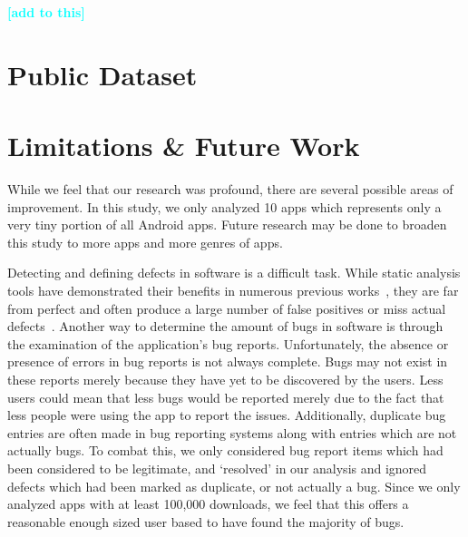 \documentclass{sig-alternate}
\newcommand{\todo}[1]{\textcolor{cyan}{\textbf{[#1]}}}
\begin{document}
\todo{add to this}

\section{Public Dataset}
\label{sec:dataset}






\section{Limitations \& Future Work}
\label{sec:threats}


While we feel that our research was profound, there are several possible areas of improvement. In this study, we only analyzed 10 apps which represents only a very tiny portion of all Android apps. Future research may be done to broaden this study to more apps and more genres of apps.




% 


Detecting and defining defects in software is a difficult task. While static analysis tools have demonstrated their benefits in numerous previous works~\cite{7006337, johnson2013don}, they are far from perfect and often produce a large number of false positives or miss actual defects~\cite{chess2004static, Thung:2012:EWD:2351676.2351685}. Another way to determine the amount of bugs in software is through the examination of the application's bug reports. Unfortunately, the absence or presence of errors in bug reports is not always complete. Bugs may not exist in these reports merely because they have yet to be discovered by the users. Less users could mean that less bugs would be reported merely due to the fact that less people were using the app to report the issues. Additionally, duplicate bug entries are often made in bug reporting systems along with entries which are not actually bugs. To combat this, we only considered bug report items which had been considered to be legitimate, and `resolved' in our analysis and ignored defects which had been marked as duplicate, or not actually a bug. Since we only analyzed apps with at least 100,000 downloads, we feel that this offers a reasonable enough sized user based to have found the majority of bugs.
\end{document}
